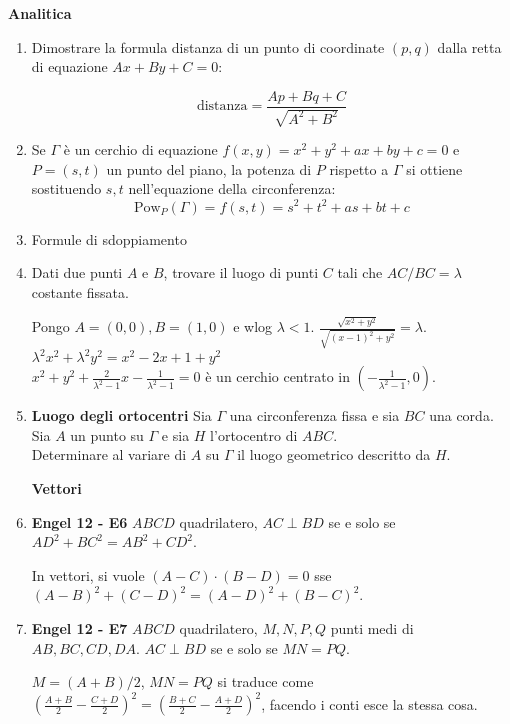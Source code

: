 \textbf{Analitica}
\begin{enumerate}
\item  Dimostrare la formula distanza di un punto di coordinate $(p,q)$ dalla retta di equazione $Ax+By+C=0$:

$$\text{distanza}=\frac{Ap+Bq+C}{\sqrt{A^2+B^2}}$$

\item  Se $\Gamma$ è un cerchio di equazione $f(x,y)=x^2+y^2+ax+by+c=0$ e $P=(s,t)$ un punto del piano, la potenza di $P$ rispetto a $\Gamma$ si ottiene sostituendo $s,t$ nell'equazione della circonferenza:\\
$$\text{Pow}_P(\Gamma)=f(s,t)=s^2+t^2+as+bt+c$$

\item Formule di sdoppiamento

\item Dati due punti $A$ e $B$, trovare il luogo di punti $C$ tali che $AC/BC=\lambda$ costante fissata.\\
\begin{sol}
 Pongo $A=(0,0),B=(1,0)$ e wlog $\lambda < 1$. $\frac{\sqrt{x^2+y^2}}{\sqrt{(x-1)^2+y^2}}=\lambda$.\\
 $\lambda^2 x^2 + \lambda^2 y^2 =x^2-2x+1+y^2$\\
 $ x^2+y^2+\frac{2}{\lambda^2-1}x - \frac{1}{\lambda^2-1}=0$
 è un cerchio centrato in $(-\frac{1}{\lambda^2-1},0)$.
\end{sol}

\item \textbf{Luogo degli ortocentri} Sia $\Gamma$ una circonferenza fissa e sia $BC$ una corda. Sia $A$ un punto su $\Gamma$ e sia $H$ l'ortocentro di $ABC$.\\
Determinare al variare di $A$ su $\Gamma$ il luogo geometrico descritto da $H$.


\textbf{Vettori}
\item \textbf{Engel 12 - E6} $ABCD$ quadrilatero, $AC\perp BD$ se e solo se $AD^2+BC^2=AB^2+CD^2$.\\
\begin{sol}
 In vettori, si vuole $(A-C)\cdot (B-D) = 0$ sse $(A-B)^2+(C-D)^2=(A-D)^2+(B-C)^2$.
\end{sol}

\item \textbf{Engel 12 - E7} $ABCD$ quadrilatero, $M,N,P,Q$ punti medi di $AB,BC,CD,DA$. $AC\perp BD$ se e solo se $MN=PQ$.\\
\begin{sol}
 $M=(A+B)/2$, $MN=PQ$ si traduce come $(\frac{A+B}{2}-\frac{C+D}{2})^2=(\frac{B+C}{2}-\frac{A+D}{2})^2$, facendo i conti esce la stessa cosa.
\end{sol}


\end{enumerate}
